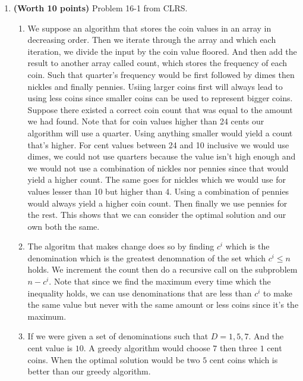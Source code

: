 \documentclass[letterpaper,11pt]{article}
\begin{document}
\begin{enumerate}
\item \textbf{(Worth 10 points)} Problem 16-1 from CLRS.
\begin{enumerate}
\item We suppose an algorithm that stores the coin values in an array in decreasing order. Then we iterate through the array and which each iteration, we divide the input by the coin value floored. And then add the result to another array called count, which stores the frequency of each coin. Such that quarter's frequency would be first followed by dimes then nickles and finally pennies. Usiing larger coins first will always lead to using less coins since smaller coins can be used to represent bigger coins. Suppose there existed a correct coin count that was equal to the amount we had found. Note that for coin values higher than 24 cents our algorithm will use a quarter. Using anything smaller would yield a count that's higher. For cent values between 24 and 10 inclusive we would use dimes, we could not use quarters because the value isn't high enough and we would not use a combination of nickles nor pennies since that would yield a higher count. The same goes for nickles which we would use for values lesser than 10 but higher than 4. Using a combination of pennies would always yield a higher coin count. Then finally we use pennies for the rest. This shows that we can consider the optimal solution and our own both the same.

\item The algoritm that makes change does so by finding $c^i$ which is the denomination which is the greatest denomnation of the set which $c^i \leq n$ holds. We increment the count then do a recursive call on the subproblem $n-c^i$. Note that since we find the maximum every time  which the inequality holds, we can use denominations that are less than $c^i$ to make the same value but never with the same amount or less coins since it's the maximum.

\item If we were given a set of denominations such that $D = {1,5,7}$. And the cent value is $10$. A greedy algorithm would choose $7$ then three $1$ cent coins. When the optimal solution would be two $5$ cent coins which is better than our greedy algorithm.


\end{enumerate}
\end{enumerate}
\end{document}
